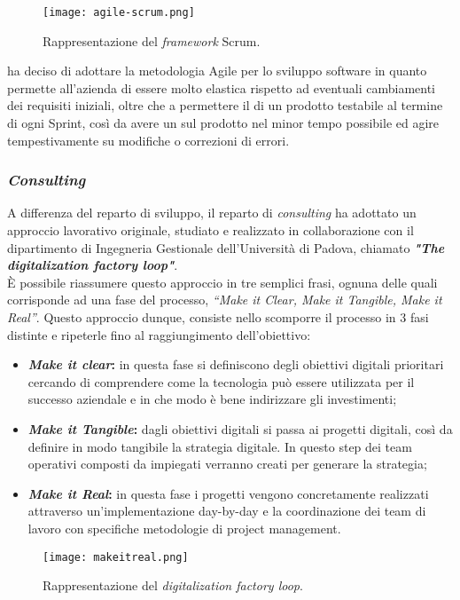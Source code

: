 \begin{figure}[h]
\texttt{[image: agile-scrum.png]}
\centering
\caption{Rappresentazione del \textit{\gls{framework}} Scrum.}
\label{fig:scrum}
\end{figure}
\AD{} ha deciso di adottare la metodologia Agile per lo sviluppo software in quanto permette all'azienda di essere molto elastica rispetto ad eventuali cambiamenti dei requisiti iniziali, oltre che a permettere il  di un prodotto testabile al termine di ogni Sprint, così da avere un  sul prodotto nel minor tempo possibile ed agire tempestivamente su modifiche o correzioni di errori.  

\subsubsection*{\textit{Consulting}}
A differenza del reparto di sviluppo, il reparto di \textit{consulting} ha adottato un approccio lavorativo originale, studiato e realizzato in collaborazione con il dipartimento di Ingegneria Gestionale dell’Università di Padova, chiamato \textbf{\textit{"The digitalization factory loop"}}.\\
\`E possibile riassumere questo approccio in tre semplici frasi, ognuna delle quali corrisponde ad una fase del processo, \textit{“Make it Clear, Make it Tangible, Make it Real”}.
Questo approccio dunque, consiste nello scomporre il processo in 3 fasi distinte e ripeterle fino al raggiungimento dell'obiettivo:
\begin{itemize}
\item \textbf{\textit{Make it clear}:} in questa fase si definiscono degli obiettivi digitali prioritari cercando di comprendere come la tecnologia può essere utilizzata per il successo aziendale e in che modo è bene indirizzare gli investimenti;
\item \textbf{\textit{Make it Tangible}:} dagli obiettivi digitali si passa ai progetti digitali, così da definire in modo tangibile la strategia digitale. In questo step dei team operativi composti da impiegati verranno creati per generare la strategia;
\item \textbf{\textit{Make it Real}:} in questa fase i progetti vengono concretamente realizzati attraverso un’implementazione day-by-day e la coordinazione dei team di lavoro con specifiche metodologie di project management.
\end{itemize}

\begin{figure}[h]
\texttt{[image: makeitreal.png]}
\centering
\caption{Rappresentazione del \textit{digitalization factory loop}.} 
\label{fig:make-it-real}
\end{figure}

